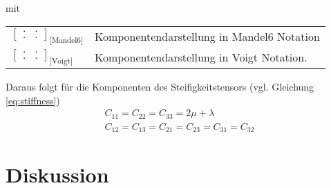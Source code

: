 \documentclass[10pt,a4paper,oneside]{article}
\begin{document}
mit
\begin{table}[!h]
\centering
	\begin{tabular}{l|l}%
		$\begin{bmatrix}.&.\\.&.\end{bmatrix}_{\text{[Mandel6]}}$ & Komponentendarstellung in Mandel6 Notation \\
		$\begin{bmatrix}.&.\\.&.\end{bmatrix}_{\text{[Voigt]}}$ & Komponentendarstellung in Voigt Notation.
	\end{tabular}
\end{table}
\FloatBarrier

Daraus folgt für die Komponenten des Steifigkeitstensors (vgl. Gleichung \ref{eq:stiffness})
\begin{align}
C_{11} = C_{22} = C_{33} = 2\mu + \lambda	\\
C_{12} = C_{13} = C_{21} = C_{23} = C_{31} = C_{32}
\end{align}

\section{Diskussion}
\end{document}
